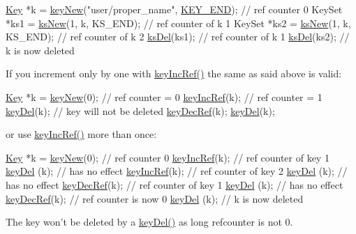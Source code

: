 \begin{DoxyCodeInclude}
\hyperlink{classkdb_1_1Key_a5679f5cae63caddd64a60388b9cc77fa}{Key} *k = \hyperlink{group__key_gad23c65b44bf48d773759e1f9a4d43b89}{keyNew}(\textcolor{stringliteral}{"user/proper\_name"}, \hyperlink{group__key_gga91fb3178848bd682000958089abbaf40aa8adb6fcb92dec58fb19410eacfdd403}{KEY\_END}); \textcolor{comment}{// ref counter 0}
KeySet *ks1 = \hyperlink{group__keyset_ga671e1aaee3ae9dc13b4834a4ddbd2c3c}{ksNew}(1, k, KS\_END); \textcolor{comment}{// ref counter of k 1}
KeySet *ks2 = \hyperlink{group__keyset_ga671e1aaee3ae9dc13b4834a4ddbd2c3c}{ksNew}(1, k, KS\_END); \textcolor{comment}{// ref counter of k 2}
\hyperlink{group__keyset_ga27e5c16473b02a422238c8d970db7ac8}{ksDel}(ks1); \textcolor{comment}{// ref counter of k 1}
\hyperlink{group__keyset_ga27e5c16473b02a422238c8d970db7ac8}{ksDel}(ks2); \textcolor{comment}{// k is now deleted}
\end{DoxyCodeInclude}
 If you increment only by one with \hyperlink{group__key_ga6970a6f254d67af7e39f8e469bb162f1}{key\+Inc\+Ref()} the same as said above is valid\+:


\begin{DoxyCodeInclude}
\hyperlink{classkdb_1_1Key_a5679f5cae63caddd64a60388b9cc77fa}{Key} *k = \hyperlink{group__key_gad23c65b44bf48d773759e1f9a4d43b89}{keyNew}(0); \textcolor{comment}{// ref counter = 0}
\hyperlink{group__key_ga6970a6f254d67af7e39f8e469bb162f1}{keyIncRef}(k); \textcolor{comment}{// ref counter = 1}
\hyperlink{group__key_ga3df95bbc2494e3e6703ece5639be5bb1}{keyDel}(k); \textcolor{comment}{// key will not be deleted}
\hyperlink{group__key_ga2c6433ca22109e4e141946057eccb283}{keyDecRef}(k);
\hyperlink{group__key_ga3df95bbc2494e3e6703ece5639be5bb1}{keyDel}(k);
\end{DoxyCodeInclude}
 or use \hyperlink{group__key_ga6970a6f254d67af7e39f8e469bb162f1}{key\+Inc\+Ref()} more than once\+:


\begin{DoxyCodeInclude}
\hyperlink{classkdb_1_1Key_a5679f5cae63caddd64a60388b9cc77fa}{Key} *k = \hyperlink{group__key_gad23c65b44bf48d773759e1f9a4d43b89}{keyNew}(0); \textcolor{comment}{// ref counter 0}
\hyperlink{group__key_ga6970a6f254d67af7e39f8e469bb162f1}{keyIncRef}(k); \textcolor{comment}{// ref counter of key 1}
\hyperlink{group__key_ga3df95bbc2494e3e6703ece5639be5bb1}{keyDel} (k);   \textcolor{comment}{// has no effect}
\hyperlink{group__key_ga6970a6f254d67af7e39f8e469bb162f1}{keyIncRef}(k); \textcolor{comment}{// ref counter of key 2}
\hyperlink{group__key_ga3df95bbc2494e3e6703ece5639be5bb1}{keyDel} (k);   \textcolor{comment}{// has no effect}
\hyperlink{group__key_ga2c6433ca22109e4e141946057eccb283}{keyDecRef}(k); \textcolor{comment}{// ref counter of key 1}
\hyperlink{group__key_ga3df95bbc2494e3e6703ece5639be5bb1}{keyDel} (k);   \textcolor{comment}{// has no effect}
\hyperlink{group__key_ga2c6433ca22109e4e141946057eccb283}{keyDecRef}(k); \textcolor{comment}{// ref counter is now 0}
\hyperlink{group__key_ga3df95bbc2494e3e6703ece5639be5bb1}{keyDel} (k); \textcolor{comment}{// k is now deleted}
\end{DoxyCodeInclude}
 The key won't be deleted by a \hyperlink{group__key_ga3df95bbc2494e3e6703ece5639be5bb1}{key\+Del()} as long refcounter is not 0.

